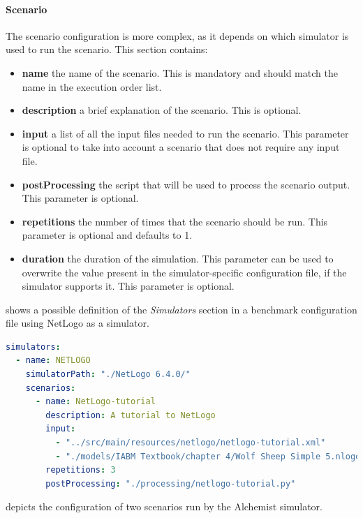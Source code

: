 \documentclass[12pt,a4paper,openright,twoside]{book}
\begin{document}
\paragraph*{Scenario}
The scenario configuration is more complex, as it depends on which simulator is used to run the scenario.
This section contains:
\begin{itemize}
  \item \textbf{name} the name of the scenario. This is mandatory and should match the name in the execution order list.
  \item \textbf{description} a brief explanation of the scenario. This is optional.
  \item \textbf{input} a list of all the input files needed to run the scenario. This parameter is optional to take into account a scenario that does not require any input file.
  \item \textbf{postProcessing} the script that will be used to process the scenario output. This parameter is optional.
  \item \textbf{repetitions} the number of times that the scenario should be run. This parameter is optional and defaults to 1.
  \item \textbf{duration} the duration of the simulation. This parameter can be used to overwrite the value present in the simulator-specific configuration file, if the simulator supports it. This parameter is optional.
\end{itemize}

 shows a possible definition of the \emph{Simulators} section in a benchmark configuration file using NetLogo as a simulator.

\begin{lstlisting}[language=yaml, label={lst:benchmark-configuration-sim1}, caption={Benchmark configuration file structure: NetLogo simulator section.}]
simulators:
  - name: NETLOGO
    simulatorPath: "./NetLogo 6.4.0/"
    scenarios:
      - name: NetLogo-tutorial
        description: A tutorial to NetLogo
        input:
          - "../src/main/resources/netlogo/netlogo-tutorial.xml"
          - "./models/IABM Textbook/chapter 4/Wolf Sheep Simple 5.nlogo"
        repetitions: 3
        postProcessing: "./processing/netlogo-tutorial.py"
\end{lstlisting}

 depicts the configuration of two scenarios run by the Alchemist simulator.
\end{document}
